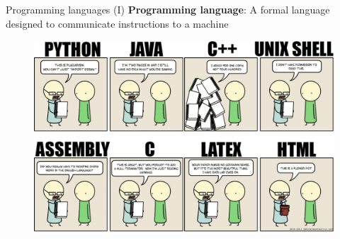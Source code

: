 \documentclass{beamer}
\begin{document}
\begin{frame}[plain]{Programming languages (I)}
	\textbf{Programming language}: A formal language designed to communicate instructions to a machine

	\vspace{-0.2cm}
   	 	\begin{figure}[t]
		\begin{center}
		    \includegraphics[width=\linewidth]{figs/lenguajes.jpg}
		\end{center}
   	 	\end{figure}

\end{frame}
\end{document}
